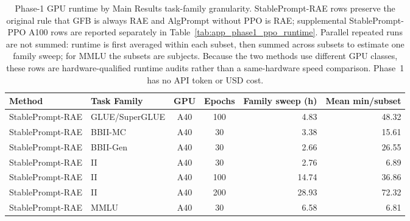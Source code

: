 \begin{table}[htbp]
\centering
\caption{Phase-1 GPU runtime by Main Results task-family granularity. StablePrompt-RAE rows preserve the original rule that GFB is always RAE and AlgPrompt without PPO is RAE; supplemental StablePrompt-PPO A100 rows are reported separately in Table~\ref{tab:app_phase1_ppo_runtime}. Parallel repeated runs are not summed: runtime is first averaged within each subset, then summed across subsets to estimate one family sweep; for MMLU the subsets are subjects. Because the two methods use different GPU classes, these rows are hardware-qualified runtime audits rather than a same-hardware speed comparison. Phase~1 has no API token or USD cost.}
\label{tab:app_phase1_runtime}
\begin{tabular}{@{}llccrr@{}}
\toprule
\textbf{Method} & \textbf{Task Family} & \textbf{GPU} & \textbf{Epochs} & \textbf{Family sweep (h)} & \textbf{Mean min/subset} \\ \midrule
StablePrompt-RAE & GLUE/SuperGLUE & A40 & 100 & 4.83 & 48.32 \\
StablePrompt-RAE & BBII-MC & A40 & 30 & 3.38 & 15.61 \\
StablePrompt-RAE & BBII-Gen & A40 & 30 & 2.66 & 26.55 \\
StablePrompt-RAE & II & A40 & 30 & 2.76 & 6.89 \\
StablePrompt-RAE & II & A40 & 100 & 14.74 & 36.86 \\
StablePrompt-RAE & II & A40 & 200 & 28.93 & 72.32 \\
StablePrompt-RAE & MMLU & A40 & 30 & 6.58 & 6.81 \\
\bottomrule
\end{tabular}
\end{table}
